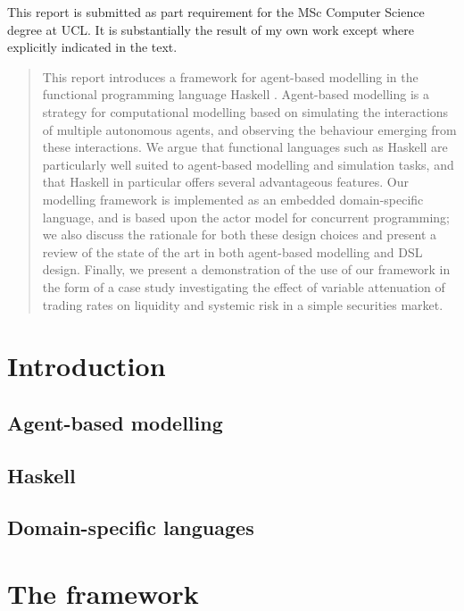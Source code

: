 \documentclass[a4paper, 11pt]{article}
\let\stdsection\section
\renewcommand\section{\newpage\stdsection}
\begin{document}
\maketitle
\begin{center}
\footnotesize This report is submitted as part requirement for the MSc Computer Science
degree at UCL. It is substantially the result of my own work except where explicitly indicated in the text.
\end{center}

\begin{abstract}
This report introduces a framework for agent-based modelling in the functional programming language Haskell \cite{Jones2003}.
Agent-based modelling \cite{Holland1991} is a strategy for computational modelling based on simulating the interactions of multiple autonomous agents, and observing the behaviour emerging from these interactions. We argue that functional languages such as Haskell are particularly well suited to agent-based modelling and simulation tasks, and that Haskell in particular offers several advantageous features. Our modelling framework is implemented as an embedded domain-specific language, and is based upon the actor model \cite{Agha1985} for concurrent programming; we also discuss the rationale for both these design choices and present a review of the state of the art in both agent-based modelling and DSL design. Finally, we present a demonstration of the use of our framework in the form of a case study investigating the effect of variable attenuation of trading rates on liquidity and systemic risk in a simple securities market.
\end{abstract}
\tableofcontents
\section{Introduction}
  \subsection{Agent-based modelling}
  \subsection{Haskell}
  \subsection{Domain-specific languages}
\section{The framework}
\end{document}
